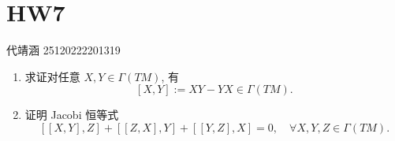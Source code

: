 \documentclass[../main.tex]{subfiles}
\begin{document}
\ifSubfilesClassLoaded{

    
    \setcounter{chapter}{6}
}{}

\chapter{ HW7 }
 代靖涵 25120222201319

\begin{exercise}{}{}
\begin{enumerate}
    \item[(1)] 求证对任意 $X, Y \in \Gamma(TM)$, 有
    \[
        [X,Y] := XY - YX \in \Gamma(TM).
    \]
    \item[(2)] 证明 Jacobi 恒等式
    \[
        [[X,Y],Z] + [[Z,X],Y] + [[Y,Z],X] = 0, \quad \forall X,Y,Z \in \Gamma(TM).
    \]
\end{enumerate}
\end{exercise}
\end{document}
